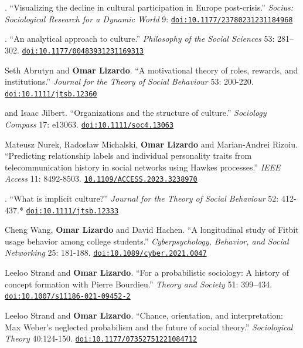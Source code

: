 

. ``Visualizing the decline in cultural participation in Europe post-crisis.'' {\em Socius: Sociological Research for a Dynamic World} 9: \href{https://doi.org/10.1177/23780231231184968}{\nolinkurl{doi:10.1177/23780231231184968}}

. ``An analytical approach to culture.'' {\em Philosophy of the Social Sciences} 53: 281–302. \href{https://doi.org/10.1177/00483931231169313}{\nolinkurl{doi:10.1177/00483931231169313}}

\ind Seth Abrutyn and {\bf Omar Lizardo}. ``A motivational theory of roles, rewards, and institutions.'' {\em Journal for the Theory of Social Behaviour} 53: 200-220. \href{https://doi.org/10.1111/jtsb.12360}{\nolinkurl{doi:10.1111/jtsb.12360}}

 and Isaac Jilbert. ``Organizations and the structure of culture.'' {\em Sociology Compass} 17: e13063. \href{https://doi.org/10.1111/soc4.13063}{\nolinkurl{doi:10.1111/soc4.13063}}

\ind Mateusz Nurek, Rados\l{}aw Michalski, {\bf Omar Lizardo} and Marian-Andrei Rizoiu. ``Predicting relationship labels and individual personality traits from telecommunication history in social networks using Hawkes processes.'' {\em IEEE Access} 11: 8492-8503. \href{https://doi.org/10.1109/ACCESS.2023.3238970}{\nolinkurl{10.1109/ACCESS.2023.3238970}}

. ``What is implicit culture?''  {\em Journal for the Theory of Social Behaviour} 52: 412-437.\textcolor{uclablue}{*} \href{https://doi.org/10.1111/jtsb.12333}{\nolinkurl{doi:10.1111/jtsb.12333}}

\ind Cheng Wang, {\bf Omar Lizardo} and David Hachen. ``A longitudinal study of Fitbit usage behavior among college students.'' {\em Cyberpsychology, Behavior, and Social Networking} 25: 181-188. \href{https://doi.org/10.1089/cyber.2021.0047}{\nolinkurl{doi:10.1089/cyber.2021.0047}}

\ind Leeloo Strand and {\bf Omar Lizardo}. ``For a probabilistic sociology: A history of concept formation with Pierre Bourdieu.'' {\em Theory and Society} 51: 399–434.  \href{https://doi.org/10.1007/s11186-021-09452-2}{\nolinkurl{doi:10.1007/s11186-021-09452-2}} 

\ind Leeloo Strand and {\bf Omar Lizardo}. ``Chance, orientation, and interpretation:  Max Weber’s neglected probabilism and the future of social theory.'' {\em Sociological Theory} 40:124-150. \href{https://doi.org/10.1177/07352751221084712}{\nolinkurl{doi:10.1177/07352751221084712}}

